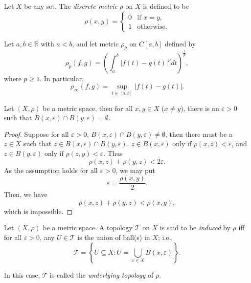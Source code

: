 \begin{example}
	\label{eg: discrete metric}
	Let $X$ be any set. The \textit{discrete metric} $\rho$ on $X$ is defined to be
	$$
	\rho(x,y) =
	\begin{cases}
		0 & \text{if $x = y$}, \\
		1 & \text{otherwise}.
	\end{cases}
	$$
\end{example}


\begin{example}
	Let $a,b \in \mathbb R$ with $a< b$, and let metric $\rho_p$ on $C[a,b]$ defined by
	$$
	\rho_p (f, g) = \left( \int_a^b |f(t) - g(t)|^p dt \right)^\frac{1}{p},
	$$
	where $p \ge 1$. In particular,
	$$
	\rho_\infty (f,g) = \sup_{t \in [a,b]} |f(t) - g(t)|.
	$$
\end{example}



\begin{proposition}
	\label{prop: metric spaces are Hausdorff}
	Let $(X, \rho)$ be a metric space, then for all $x, y \in X$ ($x \ne y$), there is an $\varepsilon > 0$ such that $B(x, \varepsilon) \cap B (y, \varepsilon) = \emptyset$.
	
	\begin{proof}
		Suppose for all $\varepsilon > 0$, $B(x, \varepsilon) \cap B(y, \varepsilon) \ne \emptyset$, then there must be a $z \in X$ such that $z \in B(x, \varepsilon) \cap B(y, \varepsilon)$. $z \in B(x, \varepsilon)$ only if $\rho(x,z) < \varepsilon$, and $z \in B(y, \varepsilon)$ only if $\rho (z,y) < \varepsilon$. Thus
		$$
		\rho(x, z) + \rho(y,z) < 2\varepsilon.
		$$
		As the assumption holds for all $\varepsilon > 0$, we may put
		$$
		\varepsilon = \frac{\rho(x,y)}{2}.
		$$
		Then, we have
		$$
		\rho(x,z) + \rho(y,z) < \rho(x,y),
		$$
		which is impossible.
	\end{proof}
\end{proposition}


\begin{definition}
	\label{def: induced topologies}
	Let $(X, \rho)$ be a metric space. A topology $\mathcal T$ on $X$ is said to be \textit{induced} by $\rho$ iff for all $\varepsilon > 0$, any $U \in \mathcal T$ is the union of ball(s) in $X$; i.e.,
	$$
	\mathcal T = \left\{ U \subseteq X :  U = \bigcup_{x \in X} B(x, \varepsilon) \right\}.
	$$
	
	In this case, $\mathcal T$ is called the \textit{underlying topology} of $\rho$.
\end{definition}


